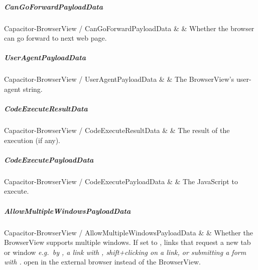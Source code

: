 
\newpage

\subparagraph{CanGoForwardPayloadData}

\begin{interfacedesc}{Capacitor-BrowserView / CanGoForwardPayloadData}
   &  & Whether the browser can go forward to next web page. \\ \hline
\end{interfacedesc}


\subparagraph{UserAgentPayloadData}

\begin{interfacedesc}{Capacitor-BrowserView / UserAgentPayloadData}
   &  & The BrowserView's user-agent string. \\ \hline
\end{interfacedesc}


\subparagraph{CodeExecuteResultData}

\begin{interfacedesc}{Capacitor-BrowserView / CodeExecuteResultData}
   &  & The result of the execution (if any). \\ \hline
\end{interfacedesc}


\subparagraph{CodeExecutePayloadData}

\begin{interfacedesc}{Capacitor-BrowserView / CodeExecutePayloadData}
   &  & The JavaScript to execute. \\ \hline
\end{interfacedesc}


\subparagraph{AllowMultipleWindowsPayloadData}

\begin{interfacedesc}{Capacitor-BrowserView / AllowMultipleWindowsPayloadData}
   &  & Whether the BrowserView supports multiple windows. If set to , links that request a new tab or window \textit{e.g.\ by , a link with , shift+clicking on a link, or submitting a form with .} open in the external browser instead of the BrowserView. \\ \hline
\end{interfacedesc}

